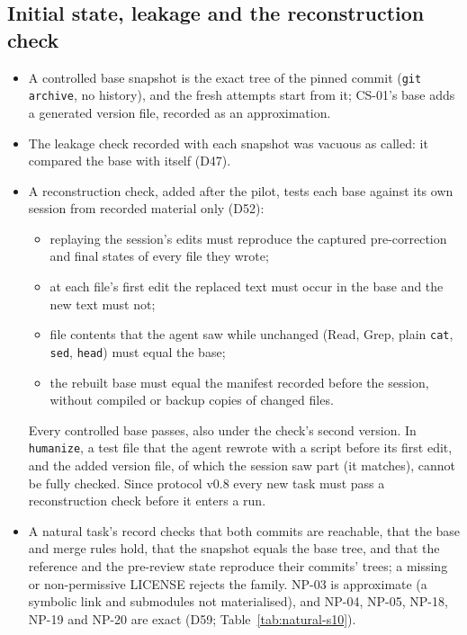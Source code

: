 \subsection{Initial state, leakage and the reconstruction check}
\label{sec:initial-state}
\begin{itemize}
\item A controlled base snapshot is the exact tree of the pinned commit (\texttt{git archive}, no history), and the fresh
  attempts start from it; CS-01's base adds a generated version file, recorded as an approximation.
\item The leakage check recorded with each snapshot was vacuous as called: it compared the base with itself (D47).
\item A reconstruction check, added after the pilot, tests each base against its own session from recorded material
  only (D52):
  \begin{itemize}
  \item replaying the session's edits must reproduce the captured pre-correction and final states of every file they
    wrote;
  \item at each file's first edit the replaced text must occur in the base and the new text must not;
  \item file contents that the agent saw while unchanged (Read, Grep, plain \texttt{cat}, \texttt{sed}, \texttt{head})
    must equal the base;
  \item the rebuilt base must equal the manifest recorded before the session, without compiled or backup copies of
    changed files.
  \end{itemize}
  Every controlled base passes, also under the check's second version. In \texttt{humanize}, a test file that the agent
  rewrote with a script before its first edit, and the added version file, of which the session saw part (it matches),
  cannot be fully checked. Since protocol v0.8 every new task must pass a reconstruction check before it enters a run.
\item A natural task's record checks that both commits are reachable, that the base and merge rules hold, that the
  snapshot equals the base tree, and that the reference and the pre-review state reproduce their commits' trees; a
  missing or non-permissive LICENSE rejects the family. NP-03 is approximate (a symbolic link and submodules not
  materialised), and NP-04, NP-05, NP-18, NP-19 and NP-20 are exact (D59; Table~\ref{tab:natural-s10}).
\end{itemize}

